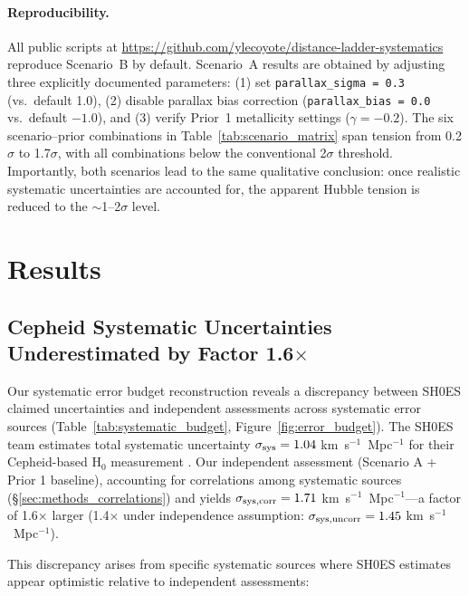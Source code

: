 \documentclass[preprint, linenumbers]{aastex701}
\begin{document}
\paragraph{Reproducibility.}
All public scripts at \url{https://github.com/ylecoyote/distance-ladder-systematics} reproduce Scenario~B by default. Scenario~A results are obtained by adjusting three explicitly documented parameters: (1) set \texttt{parallax\_sigma = 0.3} (vs.\ default 1.0), (2) disable parallax bias correction (\texttt{parallax\_bias = 0.0} vs.\ default $-1.0$), and (3) verify Prior~1 metallicity settings ($\gamma = -0.2$). The six scenario--prior combinations in Table~\ref{tab:scenario_matrix} span tension from 0.2$\sigma$ to 1.7$\sigma$, with all combinations below the conventional 2$\sigma$ threshold. Importantly, both scenarios lead to the same qualitative conclusion: once realistic systematic uncertainties are accounted for, the apparent Hubble tension is reduced to the $\sim$1--2$\sigma$ level.


\section{Results} \label{sec:results}
\subsection{Cepheid Systematic Uncertainties Underestimated by Factor 1.6$\times$}
\label{sec:results_systematics}

Our systematic error budget reconstruction reveals a discrepancy between SH0ES claimed uncertainties and independent assessments across systematic error sources (Table~\ref{tab:systematic_budget}, Figure~\ref{fig:error_budget}). The SH0ES team estimates total systematic uncertainty $\sigma_{\rm sys} = 1.04$ km~s$^{-1}$~Mpc$^{-1}$ for their Cepheid-based H$_0$ measurement \citep{Riess2022}. Our independent assessment (Scenario A + Prior 1 baseline), accounting for correlations among systematic sources (\S\ref{sec:methods_correlations}) and yields $\sigma_{\rm sys,corr} = 1.71$ km~s$^{-1}$~Mpc$^{-1}$---a factor of 1.6$\times$ larger (1.4$\times$ under independence assumption: $\sigma_{\rm sys,uncorr} = 1.45$ km~s$^{-1}$~Mpc$^{-1}$).

This discrepancy arises from specific systematic sources where SH0ES estimates appear optimistic relative to independent assessments:
\end{document}
